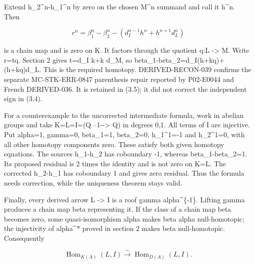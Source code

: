 \documentclass[11pt]{article}
\begin{document}
Extend h\_\allowbreak{}2\textasciicircum{}n-h\_\allowbreak{}1\textasciicircum{}n by zero on the chosen M\^{}n summand and call it h\^{}n. Then

\[
 r^n=\beta_1^n-\beta_2^n
                -(d_I^{n-1}h^n+h^{n+1}d_L^n)            \tag{3.5}
\]

is a chain map and is zero on K. It factors through the quotient q:\allowbreak{}L \allowbreak{}-> M. Write r\allowbreak{}=tq. Section 2 gives t\allowbreak{}=d\_\allowbreak{}I k\allowbreak{}+k d\_\allowbreak{}M,\allowbreak{} so beta\_\allowbreak{}1-beta\_\allowbreak{}2\allowbreak{}=d\_\allowbreak{}I(h\allowbreak{}+kq)\allowbreak{}\allowbreak{}+(h\allowbreak{}+kq)\allowbreak{}d\_\allowbreak{}L. This is the required homotopy. DERIVED-RECON-039 confirms the separate MC-STK-ERR-0847 parenthesis repair reported by P02-E0044 and French DERIVED-036. It is retained in (3.5)\allowbreak{}; it did not correct the independent sign in (3.4)\allowbreak{}.

For a counterexample to the uncorrected intermediate formula,\allowbreak{} work in abelian groups and take K\allowbreak{}=L\allowbreak{}=I\allowbreak{}=(Q --1-\allowbreak{}-> Q)\allowbreak{} in degrees 0,\allowbreak{}1. All terms of I are injective. Put alpha\allowbreak{}=1,\allowbreak{} gamma\allowbreak{}=0,\allowbreak{} beta\_\allowbreak{}1\allowbreak{}=1,\allowbreak{} beta\_\allowbreak{}2\allowbreak{}=0,\allowbreak{} h\_\allowbreak{}1\textasciicircum{}1\allowbreak{}=-1 and h\_\allowbreak{}2\textasciicircum{}1\allowbreak{}=0,\allowbreak{} with all other homotopy components zero. These satisfy both given homotopy equations. The source\textquotesingle s h\_\allowbreak{}1-h\_\allowbreak{}2 has coboundary -1,\allowbreak{} whereas beta\_\allowbreak{}1-beta\_\allowbreak{}2\allowbreak{}=1. Its proposed residual is 2 times the identity and is not zero on K\allowbreak{}=L. The corrected h\_\allowbreak{}2-h\_\allowbreak{}1 has coboundary 1 and gives zero residual. Thus the formula needs correction,\allowbreak{} while the uniqueness theorem stays valid.

Finally,\allowbreak{} every derived arrow L \allowbreak{}-> I is a roof gamma alpha\^{}\{-1\}. Lifting gamma produces a chain map beta representing it. If the class of a chain map beta becomes zero,\allowbreak{} some quasi-isomorphism alpha makes beta alpha null-homotopic; the injectivity of alpha\^{}* proved in section 2 makes beta null-homotopic. Consequently

\[
 \operatorname{Hom}_{K(A)}(L,I)
       \xrightarrow{\sim}\operatorname{Hom}_{D(A)}(L,I).  \tag{3.6}
\]
\end{document}
